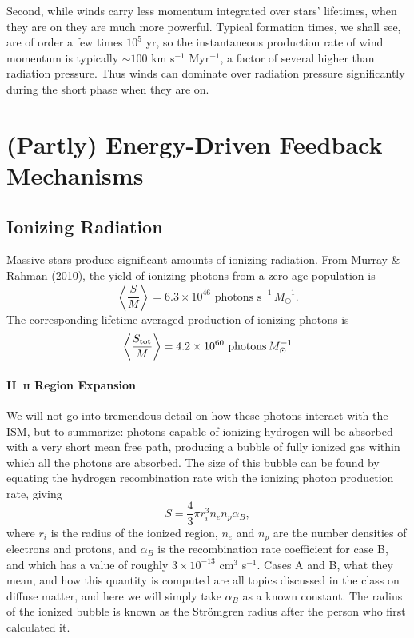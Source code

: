 Second, while winds carry less momentum integrated over stars' lifetimes, when they are on they are much more powerful. Typical formation times, we shall see, are of order a few times $10^5$ yr, so the instantaneous production rate of wind momentum is typically $\sim 100$ km s$^{-1}$ Myr$^{-1}$, a factor of several higher than radiation pressure. Thus winds can dominate over radiation pressure significantly during the short phase when they are on.

\section{(Partly) Energy-Driven Feedback Mechanisms}

\subsection{Ionizing Radiation}

Massive stars produce significant amounts of ionizing radiation. From Murray \& Rahman (2010), the yield of ionizing photons from a zero-age population is
\begin{equation}
\left\langle\frac{S}{M}\right\rangle = 6.3\times 10^{46}\mbox{ photons s}^{-1}\,M_\odot^{-1}.
\end{equation}
The corresponding lifetime-averaged production of ionizing photons is
\begin{equation}
\left\langle \frac{S_{\rm tot}}{M}\right\rangle = 4.2\times 10^{60}\mbox{ photons}\,M_{\odot}^{-1}
\end{equation}

\paragraph{H~\textsc{ii} Region Expansion}

We will not go into tremendous detail on how these photons interact with the ISM, but to summarize: photons capable of ionizing hydrogen will be absorbed with a very short mean free path, producing a bubble of fully ionized gas within which all the photons are absorbed. The size of this bubble can be found by equating the hydrogen recombination rate with the ionizing photon production rate, giving
\begin{equation}
S = \frac{4}{3} \pi r_i^3 n_e n_p \alpha_B,
\end{equation}
where $r_i$ is the radius of the ionized region, $n_e$ and $n_p$ are the number densities of electrons and protons, and $\alpha_B$ is the recombination rate coefficient for case B, and which has a value of roughly $3\times 10^{-13}$ cm$^3$ s$^{-1}$. Cases A and B, what they mean, and how this quantity is computed are all topics discussed in the class on diffuse matter, and here we will simply take $\alpha_B$ as a known constant. The radius of the ionized bubble is known as the Str\"omgren radius after the person who first calculated it.

